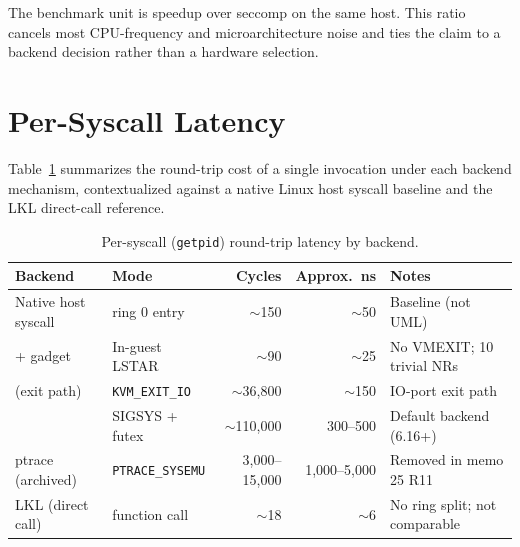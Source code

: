 \noindent
The benchmark unit is speedup over seccomp on the same host.  This
ratio cancels most CPU-frequency and microarchitecture noise and
ties the claim to a backend decision rather than a hardware selection.


\section{Per-Syscall Latency}
\label{sec:bench-syscall}

Table~\ref{tab:syscall-latency} summarizes the round-trip cost of a
single  invocation under each backend mechanism,
contextualized against a native Linux host syscall baseline and
the LKL direct-call reference.

\begin{table}[htbp]
\centering
\caption{Per-syscall (\texttt{getpid}) round-trip latency by backend.}
\label{tab:syscall-latency}
\begin{tabular}{@{}llrrl@{}}
\toprule
Backend & Mode & Cycles & Approx.\ ns & Notes \\
\midrule
Native host syscall & ring 0 entry & $\sim$150 & $\sim$50 & Baseline (not UML) \\
\KVMvTwo{} + gadget & In-guest LSTAR & $\sim$90 & $\sim$25 & No VMEXIT; 10 trivial NRs \\
\KVMvTwo{} (exit path) & \texttt{KVM\_EXIT\_IO} & $\sim$36,800 & $\sim$150 & IO-port exit path \\
\Seccomp{} & SIGSYS + futex & $\sim$110,000 & 300--500 & Default backend (6.16+) \\
ptrace (archived) & \texttt{PTRACE\_SYSEMU} & 3,000--15,000 & 1,000--5,000 & Removed in memo 25 R11 \\
\midrule
LKL (direct call) & function call & $\sim$18 & $\sim$6 & No ring split; not comparable \\
\bottomrule
\end{tabular}
\end{table}

